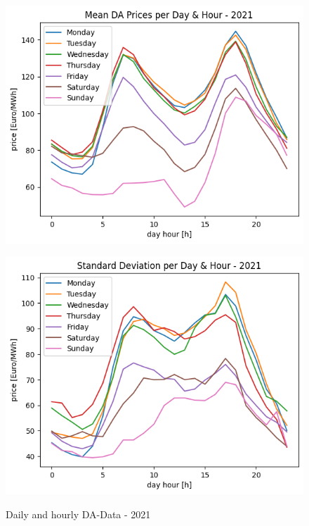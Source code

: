 \begin{figure}[H]
	\centering
	\begin{minipage}{0.49\textwidth}
		\includegraphics[width=1\linewidth]{pictures/DA/Mean DA Prices per Day and Hour - 2021.png}
		\label{fig:meanDA2021}
	\end{minipage} \hfill
	\begin{minipage}{0.49\textwidth}
		\includegraphics[width=1\linewidth]{pictures/DA/Standard Deviation per Day and Hour - 2021.png}
		\label{fig:stdDA2021}
	\end{minipage}
	\caption{Daily and hourly DA-Data - 2021 }
\end{figure}

